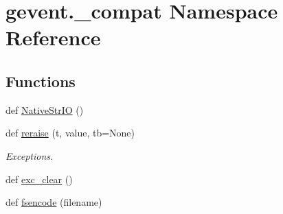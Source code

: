 \hypertarget{namespacegevent_1_1__compat}{}\section{gevent.\+\_\+compat Namespace Reference}
\label{namespacegevent_1_1__compat}
\subsection*{Functions}
\begin{DoxyCompactItemize}
\item 
def \hyperlink{namespacegevent_1_1__compat_a4a0e1b8df67d60b99bd9cc9a3cf71de5}{Native\+Str\+IO} ()
\item 
def \hyperlink{namespacegevent_1_1__compat_a07063d0a567e55c2e6081fe27aea1daf}{reraise} (t, value, tb=None)
\begin{DoxyCompactList}\small\item\em Exceptions. \end{DoxyCompactList}\item 
def \hyperlink{namespacegevent_1_1__compat_a50c20e8d50f8dbbc53fecc5beb05b37f}{exc\+\_\+clear} ()
\item 
def \hyperlink{namespacegevent_1_1__compat_a01664232f6552b9c39c515aed5b9a2a9}{fsencode} (filename)
\end{DoxyCompactItemize}

